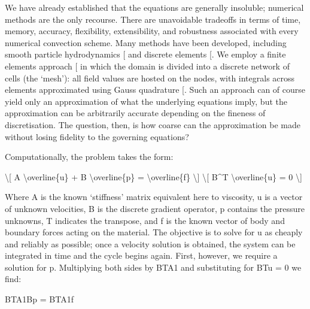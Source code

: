 \documentclass[letterpaper,10pt,english]{jupyterBook}
\begin{document}
\sphinxAtStartPar
We have already established that the equations are generally insoluble; numerical methods are the only recourse. There are unavoidable tradeoffs in terms of time, memory, accuracy, flexibility, extensibility, and robustness associated with every numerical convection scheme. Many methods have been developed, including smooth particle hydrodynamics {[}\sphinxcite{references:id58}{]} and discrete elements {[}\sphinxcite{references:id57}{]}. We employ a finite elements approach {[}\sphinxcite{references:id69}{]} in which the domain is divided into a discrete network of cells (the ‘mesh’): all field values are hosted on the nodes, with integrals across elements approximated using Gauss quadrature {[}\sphinxcite{references:id61}{]}. Such an approach can of course yield only an approximation of what the underlying equations imply, but the approximation can be arbitrarily accurate depending on the fineness of discretisation. The question, then, is how coarse can the approximation be made without losing fidelity to the governing equations?

\sphinxAtStartPar
Computationally, the problem takes the form:

\sphinxAtStartPar
\textbackslash{}{[} A \textbackslash{}overline\{u\} + B \textbackslash{}overline\{p\} = \textbackslash{}overline\{f\} \textbackslash{}{]}
\textbackslash{}{[} B\textasciicircum{}T \textbackslash{}overline\{u\} = 0 \textbackslash{}{]}

\sphinxAtStartPar
Where A is the known ‘stiffness’ matrix equivalent here to viscosity, u is a vector of unknown velocities, B is the discrete gradient operator, p contains the pressure unknowns, T indicates the transpose, and f is the known vector of body and boundary forces acting on the material. The objective is to solve for u as cheaply and reliably as possible; once a velocity solution is obtained, the system can be integrated in time and the cycle begins again. First, however, we require a solution for p. Multiplying both sides by BTA\sphinxhyphen{}1 and substituting for BTu = 0 we find:

\sphinxAtStartPar
BTA\sphinxhyphen{}1Bp = BTA\sphinxhyphen{}1f
\end{document}
